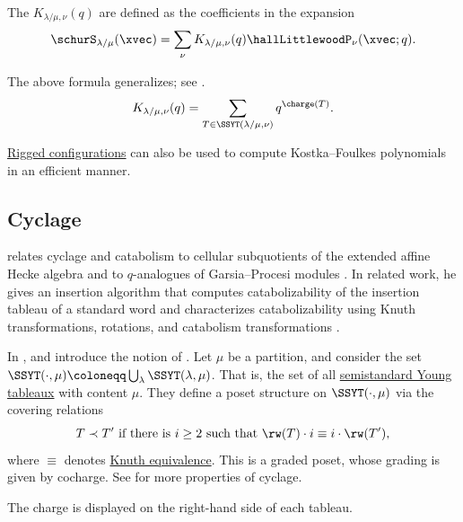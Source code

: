 The 
\label{skewKostkaFoulkesPolynomial} $K_{\lambda/\mu,\nu}(q)$
are defined as the coefficients in the expansion
\[
\schurS_{\lambda/\mu}(\xvec) = \sum_{\nu}K_{\lambda/\mu,\nu}(q) \hallLittlewoodP_{\nu}(\xvec;q).
\]

The above formula generalizes; see \cite[Cor.~2.5.8]{Butler1994}.
\[
K_{\lambda/\mu,\nu}(q) =  \sum_{T \in \SSYT(\lambda/\mu,\nu)} q^{\charge(T)}.
\]


\hyperref[riggedConfigurations]{Rigged configurations} can also be used to
compute Kostka--Foulkes polynomials in an efficient manner.
 
 
 \subsection[cyclage]{Cyclage}

 relates cyclage and catabolism to cellular subquotients
of the extended affine Hecke algebra and to $q$-analogues of
Garsia--Procesi modules \cite{Blasiak2011Cyclage}.  In related work, he gives
an insertion algorithm that computes catabolizability of the insertion tableau
of a standard word and characterizes catabolizability using Knuth
transformations, rotations, and catabolism transformations
\cite{Blasiak2012Catabolizability}.


In \cite{LascouxSchutzenberger1981}, 
and  introduce the notion
of \label{cyclageDefinition}.  Let $\mu$ be a partition,
and consider the set $\SSYT(\cdot,\mu) \coloneqq \bigcup_\lambda \SSYT(\lambda,\mu)$.
That is, the set of all \hyperref[semistandardYoungTableau]{semistandard Young
tableaux} with content $\mu$.
They define a poset structure on $\SSYT(\cdot,\mu)$ via the covering relations
\[
 T \prec T' \text{ if there is $i\geq 2$ such that } \rw(T)\cdot i \equiv i\cdot \rw(T'),
\]
where $\equiv$ denotes \hyperref[knuthRelations]{Knuth equivalence}.  This is a graded poset,
whose grading is given by cocharge.
See \cite[Sec.~5.6]{Lothaire2002} for more properties of cyclage.

\begin{example*}
The charge is displayed on the right-hand side of each tableau.
\begin{figure}
\end{figure}
\end{example*}
 
